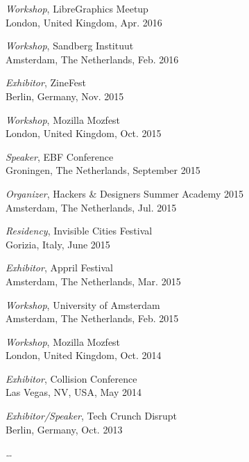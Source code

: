 \begin{itemize}[leftmargin=0.15in, label={}]
{{        {\emph{Workshop}, LibreGraphics Meetup} \\
        {London, United Kingdom, Apr. 2016} \\
    }}
    \small{\item{
        {\emph{Workshop}, Sandberg Instituut} \\
        {Amsterdam, The Netherlands, Feb. 2016} \\
    }}
    \small{\item{
        {\emph{Exhibitor}, ZineFest} \\
        {Berlin, Germany, Nov. 2015} \\
    }}
    \small{\item{
        {\emph{Workshop}, Mozilla Mozfest} \\
        {London, United Kingdom, Oct. 2015} \\
    }}
    \small{\item{
        {\emph{Speaker}, EBF Conference} \\
        {Groningen, The Netherlands, September 2015} \\
    }}
    \small{\item{
        {\emph{Organizer}, Hackers \& Designers Summer Academy 2015} \\
        {Amsterdam, The Netherlands, Jul. 2015} \\
    }}
    \small{\item{
        {\emph{Residency}, Invisible Cities Festival} \\
        {Gorizia, Italy, June 2015} \\
    }}
    \small{\item{
        {\emph{Exhibitor}, Appril Festival} \\
        {Amsterdam, The Netherlands, Mar. 2015} \\
    }}
    \small{\item{
        {\emph{Workshop}, University of Amsterdam} \\
        {Amsterdam, The Netherlands, Feb. 2015} \\
    }}
    \small{\item{
        {\emph{Workshop}, Mozilla Mozfest} \\
        {London, United Kingdom, Oct. 2014} \\
    }}
    \small{\item{
        {\emph{Exhibitor}, Collision Conference} \\
        {Las Vegas, NV, USA, May 2014} \\
    }}
    \small{\item{
        {\emph{Exhibitor/Speaker}, Tech Crunch Disrupt} \\
        {Berlin, Germany, Oct. 2013} \\
    }}
    \small{\item{
        {\emph{\ldots}}
    }}
 \end{itemize}


